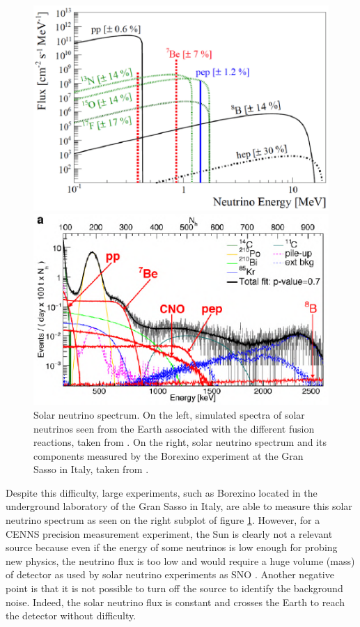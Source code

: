 \begin{figure}
\begin{minipage}{0.48\textwidth}
\includegraphics [scale=1]{Figures/Introduction/solar_neutrino_spectrum_simu.pdf}
\end{minipage}
\hfill
\begin{minipage}{0.48\textwidth}
\includegraphics [scale=1]{Figures/Introduction/solar_neutrino_spectrum_exp.pdf}
\end{minipage}
\caption{Solar neutrino spectrum. On the left, simulated spectra of solar neutrinos seen from the Earth associated with the different fusion reactions, taken from \cite{DAngelo:2014lmb}.
On the right, solar neutrino spectrum and its components measured by the Borexino experiment at the Gran Sasso in Italy, taken from \cite{Redchuk:2020mza}.}
\label{fig:solar-neutrino-spectrum}
\end{figure}

Despite this difficulty, large experiments, such as Borexino located in the underground laboratory of the Gran Sasso in Italy, are able to measure this solar neutrino spectrum as seen on the right subplot of figure \ref{fig:solar-neutrino-spectrum}. However, for a CENNS precision measurement experiment, the Sun is clearly not a relevant source because even if the energy of some neutrinos is low enough for probing new physics, the neutrino flux is too low and would require a huge volume (mass) of detector as used by solar neutrino experiments as SNO \cite{Bellerive:2016}. Another negative point is that it is not possible to turn off the source to identify the background noise. Indeed, the solar neutrino flux is constant and crosses the Earth to reach the detector without difficulty.

